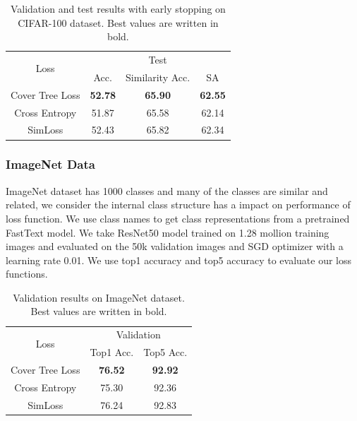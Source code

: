 \documentclass[twoside]{article}
\theoremstyle{definition}
\begin{document}
\begin{table}[]
\caption{Validation and test results with early stopping on CIFAR-100 dataset. Best values are written in bold.} \label{cifar100}
\begin{center}
\begin{tabular}{@{}cccc@{}}
\toprule
\multirow{2}{*}{Loss} & \multicolumn{3}{c}{Test}    \\ \cmidrule(l){2-4} 
                      & Acc. & Similarity Acc. & SA \\ \cmidrule(r){1-1}
Cover Tree Loss       & \textbf{52.78}     &  \textbf{65.90}               &  \textbf{62.55}  \\
Cross Entropy         &  51.87    &   65.58              &  62.14  \\
SimLoss               &    52.43  &    65.82             & 62.34  \\\bottomrule
\end{tabular}
\end{center}
\end{table}


\subsubsection{ImageNet Data}
ImageNet dataset \cite{Russakovsky2015ImageNetLS} has 1000 classes and many of the classes are similar and related, we consider the internal class structure has a impact on performance of loss function.
We use class names to get class representations from a pretrained FastText model.
We take ResNet50 model \cite{He2016DeepRL} trained on 1.28 mollion training images and evaluated on the 50k validation images and SGD optimizer with a learning rate 0.01.
We use top1 accuracy and top5 accuracy to evaluate our loss functions.



\begin{table}[]
\caption{Validation results on ImageNet dataset. Best values are written in bold.} \label{imagenet}
\begin{center}
\begin{tabular}{@{}ccc@{}}
\toprule
\multirow{2}{*}{Loss} & \multicolumn{2}{c}{Validation} \\ \cmidrule(l){2-3} 
                      & Top1 Acc.      & Top5 Acc.     \\ \cmidrule(r){1-1}
Cover Tree Loss       & \textbf{76.52} & \textbf{92.92} \\
Cross Entropy         & 75.30          & 92.36         \\
SimLoss               & 76.24          & 92.83         \\ \bottomrule
\end{tabular}
\end{center}
\end{table}
\end{document}
